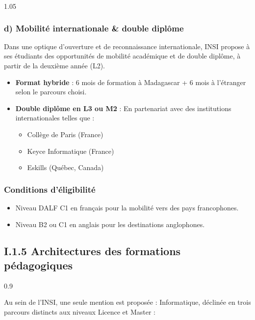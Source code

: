 \begin{spacing}{1.05}
\subsubsection*{d) Mobilité internationale \& double diplôme}

Dans une optique d'ouverture et de reconnaissance internationale, INSI propose à ses étudiants des opportunités de mobilité académique et de double diplôme, à partir de la deuxième année (L2).

\begin{itemize}[noitemsep,nolistsep]
    \item \textbf{Format hybride} : 6 mois de formation à Madagascar + 6 mois à l'étranger selon le parcours choisi.
    \item \textbf{Double diplôme en L3 ou M2} : En partenariat avec des institutions internationales telles que :
    \begin{itemize}[noitemsep,nolistsep]
        \item Collège de Paris (France)
        \item Keyce Informatique (France)
        \item Eskills (Québec, Canada)
    \end{itemize}
\end{itemize}


\subsubsection*{Conditions d'éligibilité}

\begin{itemize}[noitemsep,nolistsep]
    \item Niveau DALF C1 en français pour la mobilité vers des pays francophones.
    \item Niveau B2 ou C1 en anglais pour les destinations anglophones.
\end{itemize}

\subsection{I.1.5 Architectures des formations pédagogiques}

\noindent
{\footnotesize
\begin{spacing}{0.9}
\begin{minipage}{0.95\textwidth}
Au sein de l'INSI, une seule mention est proposée : Informatique, déclinée en trois parcours distincts aux niveaux Licence et Master :
\end{minipage}
\end{spacing}
}

\end{spacing}


